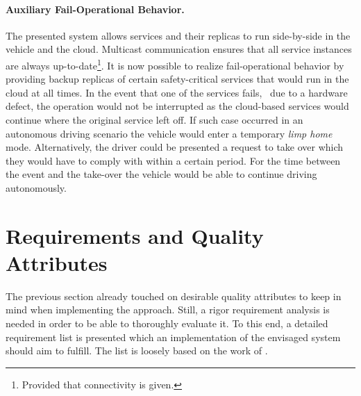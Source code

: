 \paragraph{Auxiliary Fail-Operational Behavior.}
The presented system allows services and their replicas to run side-by-side in the vehicle and the cloud. Multicast communication ensures that all service instances are always up-to-date\footnote{Provided that connectivity is given.}. It is now possible to realize fail-operational behavior by providing backup replicas of certain safety-critical services that would run in the cloud at all times. In the event that one of the services fails, \eg\ due to a hardware defect, the operation would not be interrupted as the cloud-based services would continue where the original service left off. If such case occurred in an autonomous driving scenario the vehicle would enter a temporary \emph{limp home} mode. Alternatively, the driver could be presented a request to take over which they would have to comply with within a certain period. For the time between the event and the take-over the vehicle would be able to continue driving autonomously.

%
%
%
%
%
%
%
%
%
%

\section{Requirements and Quality Attributes} \label{sec:requirements}
The previous section already touched on desirable quality attributes to keep in mind when implementing the approach. Still, a rigor requirement analysis is needed in order to be able to thoroughly evaluate it. To this end, a detailed requirement list is presented which an implementation of the envisaged system should aim to fulfill. The list is loosely based on the work of \citeauthor*{o2007quality} \cite{o2007quality}.


